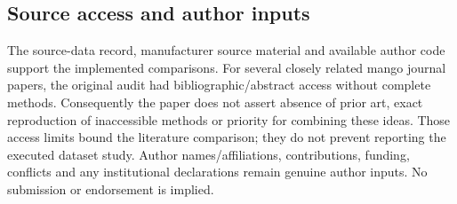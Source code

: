 \documentclass[10pt,a4paper]{article}
\begin{document}
\subsection{Source access and author inputs}
The source-data record, manufacturer source material and available author code support the implemented comparisons. For several closely related mango journal papers, the original audit had bibliographic/abstract access without complete methods. Consequently the paper does not assert absence of prior art, exact reproduction of inaccessible methods or priority for combining these ideas. Those access limits bound the literature comparison; they do not prevent reporting the executed dataset study. Author names/affiliations, contributions, funding, conflicts and any institutional declarations remain genuine author inputs. No submission or endorsement is implied.



\end{document}
